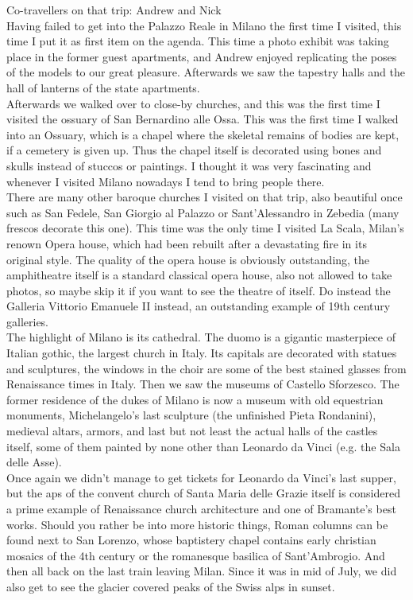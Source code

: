Co-travellers on that trip: Andrew and Nick\\

Having failed to get into the Palazzo Reale in Milano the first time I visited, this time I put it as first item on the agenda. This time a photo exhibit was taking place in the former guest apartments, and Andrew enjoyed replicating the poses of the models to our great pleasure. Afterwards we saw the tapestry halls and the hall of lanterns of the state apartments. \\
Afterwards we walked over to close-by churches, and this was the first time I visited the ossuary of San Bernardino alle Ossa. This was the first time I walked into an Ossuary, which is a chapel where the skeletal remains of bodies are kept, if a cemetery is given up. Thus the chapel itself is decorated using bones and skulls instead of stuccos or paintings. I thought it was very fascinating and whenever I visited Milano nowadays I tend to bring people there. \\
There are many other baroque churches I visited on that trip, also beautiful once such as San Fedele, San Giorgio al Palazzo or Sant'Alessandro in Zebedia (many frescos decorate this one). This time was the only time I visited La Scala, Milan's renown Opera house, which had been rebuilt after a devastating fire in its original style. The quality of the opera house is obviously outstanding, the amphitheatre itself is a standard classical opera house, also not allowed to take photos, so maybe skip it if you want to see the theatre of itself. Do instead the Galleria Vittorio Emanuele II instead, an outstanding example of 19th century galleries. \\
The highlight of Milano is its cathedral. The duomo is a gigantic masterpiece of Italian gothic, the largest church in Italy. Its capitals are decorated with statues and sculptures, the windows in the choir are some of the best stained glasses from Renaissance times in Italy. Then we saw the museums of Castello Sforzesco. The former residence of the dukes of Milano is now a museum with old equestrian monuments, Michelangelo's last sculpture (the unfinished Pieta Rondanini), medieval altars, armors, and last but not least the actual halls of the castles itself, some of them painted by none other than Leonardo da Vinci (e.g. the Sala delle Asse). \\
Once again we didn't manage to get tickets for Leonardo da Vinci's last supper, but the aps of the convent church of Santa Maria delle Grazie itself is considered a prime example of Renaissance church architecture and one of Bramante's best works. Should you rather be into more historic things, Roman columns can be found next to San Lorenzo, whose baptistery chapel contains early christian mosaics of the 4th century or the romanesque basilica of Sant'Ambrogio. And then all back on the last train leaving Milan. Since it was in mid of July, we did also get to see the glacier covered peaks of the Swiss alps in sunset.\\

